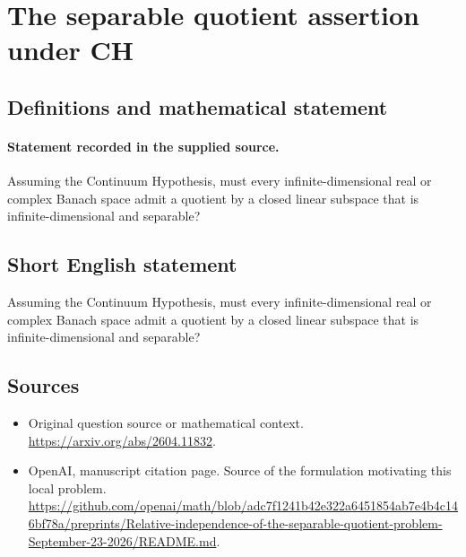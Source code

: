 \documentclass[11pt]{article}
\begin{document}
\section*{The separable quotient assertion under CH}\label{statement}
\subsection{Definitions and mathematical statement}
\paragraph{Statement recorded in the supplied source.}
Assuming the Continuum Hypothesis, must every infinite-dimensional real or complex Banach space admit a quotient by a closed linear subspace that is infinite-dimensional and separable?
\subsection{Short English statement}
Assuming the Continuum Hypothesis, must every infinite-dimensional real or complex Banach space admit a quotient by a closed linear subspace that is infinite-dimensional and separable?
\subsection{Sources}
\begin{itemize}
\item[S1] Original question source or mathematical context.
\url{https://arxiv.org/abs/2604.11832}.
\item[S2] OpenAI, manuscript citation page. Source of the formulation motivating this local problem.
\url{https://github.com/openai/math/blob/adc7f1241b42e322a6451854ab7e4b4c146bf78a/preprints/Relative-independence-of-the-separable-quotient-problem-September-23-2026/README.md}.
\end{itemize}
\end{document}
